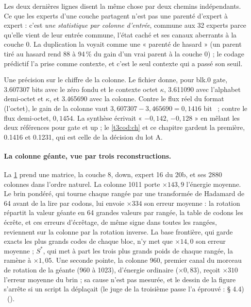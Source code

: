 Les deux dernières lignes disent la même chose par deux chemins indépendants. Ce que les experts d'une couche partagent n'est pas une parenté d'expert à expert : c'est \emph{une statistique par colonne d'entrée}, commune aux 32 experts parce qu'elle vient de leur entrée commune, l'état caché et ses canaux aberrants à la couche 0. La duplication la voyait comme une « parenté de hasard » (un parent tiré au hasard rend 88 à 94\,\% du gain d'un vrai parent à la couche 0) ; le codage prédictif l'a prise comme contexte, et c'est le seul contexte qui a passé son seuil.

Une précision sur le chiffre de la colonne. Le fichier donne, pour blk.0 gate, \num{3.607307} bits avec le zéro fondu et le contexte octet $\kappa$, \num{3.611090} avec l'alphabet demi-octet et $\kappa$, et \num{3.465690} avec la colonne. Contre le flux réel du format (l'octet), le gain de la colonne vaut $3{,}607307 - 3{,}465690 = 0{,}1416$ bit \calc~; contre le flux demi-octet, $0{,}1454$. La synthèse écrivait « $-0{,}142$, $-0{,}128$ » en mêlant les deux références pour gate et up ; le \cref{t3cod:ch} et ce chapitre gardent la première, \num{0.1416} et \num{0.1231}, qui est celle de la décision du lot A.

\begin{figure}[tbp]
\centering
\GrapheSynthColonnes
{}
\label{fig:t3-synth-colonnes}
\end{figure}

\paragraph{La colonne géante, vue par trois reconstructions.} La \cref{fig:t3-synth-colonnes} prend une matrice, la couche 8, down, expert 16 du 20b, et ses \num{2880} colonnes dans l'ordre naturel. La colonne 1011 porte $\times 143{,}9$ l'énergie moyenne. Le brin pondéré, qui tourne chaque rangée par une transformée de Hadamard de 64 avant de la lire par codons, lui envoie $\times 334$ son erreur moyenne : la rotation répartit la valeur géante en 64 grandes valeurs par rangée, la table de codons les écrête, et ces erreurs d'écrêtage, de même signe dans toutes les rangées, reviennent sur la colonne par la rotation inverse. La base frontière, qui garde exacts les plus grands codes de chaque bloc, n'y met que $\times 14{,}0$ son erreur moyenne ; $S^{*}$, qui met à part les trois plus grands poids de chaque rangée, la ramène à $\times 1{,}05$. Une seconde pointe, la colonne 960, premier canal du morceau de rotation de la géante (960 à 1023), d'énergie ordinaire ($\times 0{,}83$), reçoit $\times 310$ l'erreur moyenne du brin ; sa cause n'est pas mesurée, et le dessin de la figure s'arrête si un script la déplaçait (le juge de la troisième passe l'a éprouvé :  § 4.4) \mes~().

